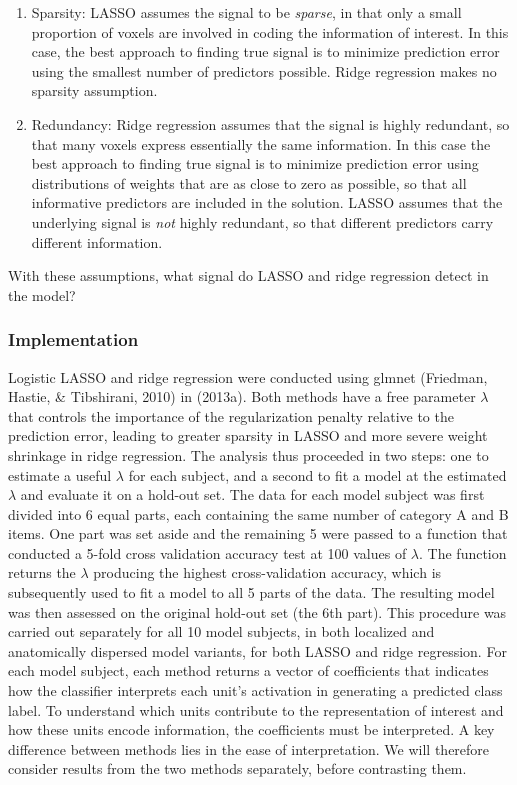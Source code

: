 \begin{enumerate}
\item Sparsity: LASSO assumes the signal to be {\em sparse}, in that only a small proportion of voxels are involved in coding the information of interest. In this case, the best approach to finding true signal is to minimize prediction error using the smallest number of predictors possible. Ridge regression makes no sparsity assumption.

\item Redundancy: Ridge regression assumes that the signal is highly redundant, so that many voxels express essentially the same information. In this case the best approach to finding true signal is to minimize prediction error using distributions of weights that are as close to zero as possible, so that all informative predictors are included in the solution. LASSO assumes that the underlying signal is {\em not} highly redundant, so that different predictors carry different information.
\end{enumerate}

With these assumptions, what signal do LASSO and ridge regression detect in the model?

\subsubsection{Implementation}
Logistic LASSO and ridge regression were conducted using glmnet (Friedman, Hastie, \& Tibshirani, 2010) in \matlab (2013a). Both methods have a free parameter $\lambda$ that controls the importance of the regularization penalty relative to the prediction error, leading to greater sparsity in LASSO and more severe weight shrinkage in ridge regression. The analysis thus proceeded in two steps: one to estimate a useful $\lambda$ for each subject, and a second to fit a model at the estimated $\lambda$ and evaluate it on a hold-out set. The data for each model subject was first divided into 6 equal parts, each containing the same number of category A and B items. One part was set aside and the remaining 5 were passed to a function that conducted a 5-fold cross validation accuracy test at 100 values of $\lambda$. The function returns the $\lambda$ producing the highest cross-validation accuracy, which is subsequently used to fit a model to all 5 parts of the data. The resulting model was then assessed on the original hold-out set (the 6th part). This procedure was carried out separately for all 10 model subjects, in both localized and anatomically dispersed model variants, for both LASSO and ridge regression. For each model subject, each method returns a vector of coefficients that indicates how the classifier interprets each unit's activation in generating a predicted class label. To understand which units contribute to the representation of interest and how these units encode information, the coefficients must be interpreted. A key difference between methods lies in the ease of interpretation. We will therefore consider results from the two methods separately, before contrasting them.


